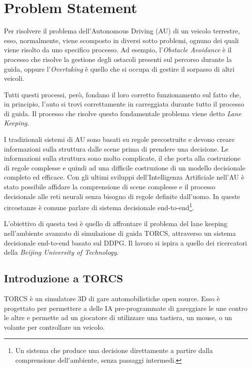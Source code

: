 \chapter{Problem Statement}

Per risolvere il problema dell'Autonomous Driving (AU) di un veicolo terrestre, esso, normalmente, viene scomposto in diversi sotto problemi, ognuno dei quali viene risolto da uno specifico processo. Ad esempio, l'\textit{Obstacle Avoidance} è il processo che risolve la gestione degli ostacoli presenti sul percorso durante la guida, oppure l'\textit{Overtaking} è quello che si occupa di gestire il sorpasso di altri veicoli.
\newline

Tutti questi processi, però, fondano il loro corretto funzionamento sul fatto che, in principio, l'auto si trovi correttamente in carreggiata durante tutto il processo di guida. Il processo che risolve questo fondamentale problema viene detto \textit{Lane Keeping}.
\newline

I tradizionali sistemi di AU sono basati su regole precostruite e devono creare informazioni sulla struttura dalle scene prima di prendere una decisione. Le informazioni sulla struttura sono molto complicate, il che porta alla costruzione di regole complesse e quindi ad una difficile costruzione di un modello decisionale completo ed efficace.
Con gli ultimi sviluppi dell'Intelligenza Artificiale nell'AU è stato possibile affidare la comprensione di scene complesse e il processo decisionale alle reti neurali senza bisogno di regole definite dall'uomo. In queste circostanze è comune parlare di sistema decisionale end-to-end\footnote{Un sistema che produce una decisione direttamente a partire dalla comprensione dell'ambiente, senza passaggi intermedi.}.
\newline

L'obiettivo di questa tesi è quello di affrontare il problema del lane keeping nell'ambiente avanzato di simulazione di guida TORCS\cite{torcsWebsite}, attraverso un sistema decisionale end-to-end basato sul DDPG. Il lavoro si ispira a quello dei ricercatori della \textit{Beijing University of Technology}\cite{mainTORCSPaper}.


\section{Introduzione a TORCS}

TORCS\cite{torcsWebsite} è un simulatore 3D di gare automobilistiche open source. Esso è progettato per permettere a delle IA pre-programmate di gareggiare le une contro le altre e permette ad un giocatore di utilizzare una tastiera, un mouse, o un volante per controllare un veicolo.

